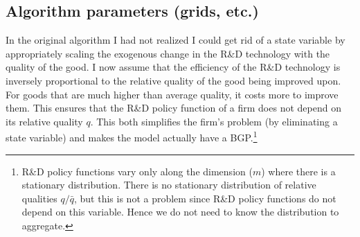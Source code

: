 \documentclass[12pt,english]{article}
\theoremstyle{remark}
\begin{document}
\subsection{Algorithm parameters (grids, etc.)}

In the original algorithm I had not realized I could get rid of a state variable by appropriately scaling the exogenous change in the R\&D technology with the quality of the good. I now assume that the efficiency of the R\&D technology is inversely proportional to the relative quality of the good being improved upon. For goods that are much higher than average quality, it costs more to improve them. This ensures that the R\&D policy function of a firm does not depend on its relative quality $q$. This both simplifies the firm's problem (by eliminating a state variable) and makes the model actually have a BGP.\footnote{R\&D policy functions vary only along the dimension ($m$) where there is a stationary distribution. There is no stationary distribution of relative qualities $q/\bar{q}$, but this is not a problem since R\&D policy functions do not depend on this variable. Hence we do not need to know the distribution to aggregate.}
\end{document}
